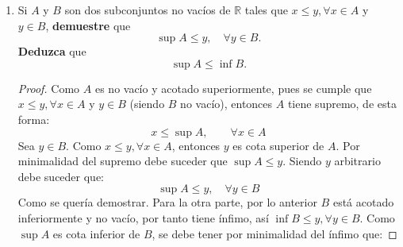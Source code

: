 \documentclass[12pt]{article}
\begin{document}
\begin{enumerate}
\begin{proof}
        Probaremos la igualdad. Procederemos por contradicción: supongamos que $\sup(-A)<-\inf A$, entonces $0<-\inf A-\sup(-A)$. Por un teorema, para $-\inf A-\sup(-A)>0$ existe un $x\in A$ tal que:
        \begin{equation*}
            \begin{split}
                x <& \inf A + -\inf A-\sup(-A)\\
                =& -\sup(-A)\\
                \Rightarrow x <& -\sup(-A)\\
                \Rightarrow \sup(-A) <& -x\\
            \end{split}
        \end{equation*}
        Donde $-x\in -A$. Lo anterior es una contradicción pues se supone que $-x\leq \sup(-A)$ (por definición de supremo). Por tanto debe suceder que $\sup(-A)=-\inf A$, es decir:
        \begin{equation*}
            \inf A = -\sup (-A)
        \end{equation*}
        \qed
    \end{proof}
    \item Si $A$ y $B$ son dos subconjuntos no vacíos de $\mathbb{R}$ tales que $x\leq y,\forall x\in A$ y $y\in B$, \textbf{demuestre} que
    \begin{equation*}
        \sup A \leq y, \quad \forall y\in B.
    \end{equation*}
    \textbf{Deduzca} que
    \begin{equation*}
        \sup A \leq \inf B.
    \end{equation*}
    \begin{proof}
        Como $A$ es no vacío y acotado superiormente, pues se cumple que $x\leq y,\forall x\in A$ y $y\in B$ (siendo $B$ no vacío), entonces $A$ tiene supremo, de esta forma:
        \begin{equation*}
            x\leq \sup A,\qquad \forall x\in A
        \end{equation*}
        Sea $y\in B$. Como $x\leq y,\forall x\in A$, entonces $y$ es cota superior de $A$. Por minimalidad del supremo debe suceder que $\sup A\leq y$. Siendo $y$ arbitrario debe suceder que:
        \begin{equation*}
            \sup A \leq y,\quad \forall y\in B
        \end{equation*}
        Como se quería demostrar. Para la otra parte, por lo anterior $B$ está acotado inferiormente y no vacío, por tanto tiene ínfimo, así $\inf B \leq y, \forall y\in B$. Como $\sup A$ es cota inferior de $B$, se debe tener por minimalidad del ínfimo que:

\end{proof}
\end{enumerate}
\end{document}

